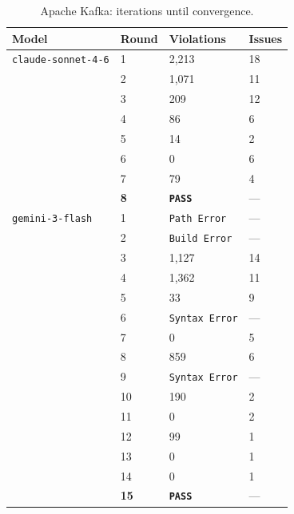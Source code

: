 \documentclass[sigconf,screen]{acmart}
\begin{document}
\begin{table}[t]
    \centering
    \small
    \caption{Apache Kafka: iterations until convergence.}
    \label{tab:convergence-kafka}
    \begin{tabular}{@{}p{}C{0.25\columnwidth}p{0.20\columnwidth}C{0.15\columnwidth}@{}}
        \toprule
        \textbf{Model} & \textbf{Round} & \textbf{Violations} & \textbf{Issues} \\
        \midrule
        \texttt{claude-sonnet-4-6} & 1 & 2,213 & 18 \\
                                                & 2 & 1,071 & 11 \\
                                                & 3 & 209 & 12 \\
                                                & 4 & 86 & 6 \\
                                                & 5 & 14 & 2 \\
                                                & 6 & 0 & 6 \\
                                                & 7 & 79 & 4 \\
                                                & \textbf{8} & \texttt{\textbf{PASS}} & --- \\
        \texttt{gemini-3-flash} & 1 & \texttt{Path Error} & --- \\
                                            & 2 & \texttt{Build Error} & --- \\
                                            & 3 & 1,127 & 14 \\
                                            & 4 & 1,362 & 11 \\
                                            & 5 & 33 & 9 \\
                                            & 6 & \texttt{Syntax Error} & --- \\
                                            & 7 & 0 & 5 \\
                                            & 8 & 859 & 6 \\
                                            & 9 & \texttt{Syntax Error} & --- \\
                                            & 10 & 190 & 2 \\
                                            & 11 & 0 & 2 \\
                                            & 12 & 99 & 1 \\
                                            & 13 & 0 & 1 \\
                                            & 14 & 0 & 1 \\
                                            & \textbf{15} & \texttt{\textbf{PASS}} & --- \\
        \bottomrule
    \end{tabular}
\end{table}
\end{document}
